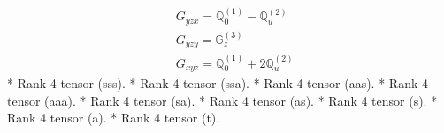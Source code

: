 \documentclass[fleqn,8pt,landscape]{jsarticle}
\begin{document}
\begin{align*}
& G_{yzx} = \mathbb{Q}_{0}^{(1)} - \mathbb{Q}_{u}^{(2)} \\
& G_{yzy} = \mathbb{G}_{z}^{(3)} \\
& G_{xyz} = \mathbb{Q}_{0}^{(1)} + 2 \mathbb{Q}_{u}^{(2)}
\end{align*}
* Rank 4 tensor (sss).
* Rank 4 tensor (ssa).
* Rank 4 tensor (aas).
* Rank 4 tensor (aaa).
* Rank 4 tensor (sa).
* Rank 4 tensor (as).
* Rank 4 tensor (s).
* Rank 4 tensor (a).
* Rank 4 tensor (t).
\end{document}
